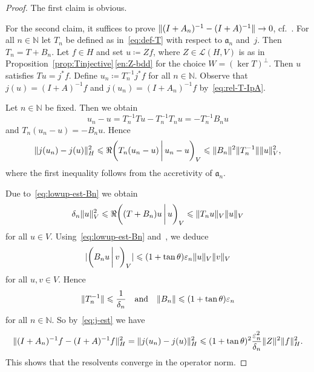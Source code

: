 \documentclass[a4paper,oneside,12pt]{amsart}
\theoremstyle{plain}
\theoremstyle{definition}
\let\le=\leqslant
\DeclarePairedDelimiter\norm{\lVert}{\rVert}
\DeclarePairedDelimiter\abs{\lvert}{\rvert}
\begin{document}
\begin{proof}
The first claim is obvious.

For the second claim, it suffices to prove $\norm{(I+A_n)^{-1} - (I + A)^{-1}}\to 0$, cf.~\cite[Subsection~VIII.1.1]{Kat1}.
For all $n\in{\mathbb{N}}$ let $T_n$ be defined as in~\eqref{eq:def-T} with respect to ${{\mathfrak{{a}}}}_n$ and~$j$. Then $T_n=T+B_n$.
Let $f\in H$ and set $u\coloneqq Zf$, where $Z\in{\mathcal{L}}(H,V)$ is as in Proposition~\ref{prop:Tinjective}\,\ref{en:Z-bdd} for the choice $W=(\ker T)^\perp$.
Then $u$ satisfies $Tu=j^*f$.
Define $u_n\coloneqq T_n^{-1} j^*f$ for all $n\in{\mathbb{N}}$. Observe that $j(u) = (I+A)^{-1}f$ and $j(u_n) = (I+A_n)^{-1}f$ by~\eqref{eq:rel-T-IpA}.

Let $n\in{\mathbb{N}}$ be fixed. Then we obtain 
\[
    u_n - u = T_n^{-1}Tu - T_n^{-1}T_n u = -T_n^{-1} B_n u
\]
and $T_n (u_n-u) = -B_n u$.
Hence
\begin{equation}
\label{eq:j-est}
    \norm{j(u_n) - j(u)}_H^2 \le \Re{{\ifthenelse{\equal{auto}{auto}}{\left({T_n(u_n-u)}\mkern3mu{\biggm|}\mkern3mu {u_n-u}\right)}{}
\ifthenelse{\equal{auto}{b}}{\bigl({T_n(u_n-u)}\mkern3mu{\biggm|}\mkern3mu {u_n-u}\bigr)}{}
\ifthenelse{\equal{auto}{B}}{\Bigl({T_n(u_n-u)}\mkern3mu{\bigm|}\mkern3mu {u_n-u}\Bigr)}{}
}}_V \le \norm{B_n}^2\norm{T_n^{-1}}\norm{u}_V^2,
\end{equation}
where the first inequality follows from the accretivity of ${{\mathfrak{{a}}}}_n$.

Due to~\eqref{eq:lowup-est-Bn} we obtain
\[
    \delta_n\norm{u}_V^2 \le \Re{{\ifthenelse{\equal{auto}{auto}}{\left({(T+B_n)u}\mkern3mu{\biggm|}\mkern3mu {u}\right)}{}
\ifthenelse{\equal{auto}{b}}{\bigl({(T+B_n)u}\mkern3mu{\biggm|}\mkern3mu {u}\bigr)}{}
\ifthenelse{\equal{auto}{B}}{\Bigl({(T+B_n)u}\mkern3mu{\bigm|}\mkern3mu {u}\Bigr)}{}
}}_V\le\norm{T_n u}_V\norm{u}_V
\]
for all $u\in V$. Using~\eqref{eq:lowup-est-Bn} and~\cite[(1.15) in Section~VI.1]{Kat1}, we deduce 
\[
    \abs{{{\ifthenelse{\equal{auto}{auto}}{\left({B_n u}\mkern3mu{\biggm|}\mkern3mu {v}\right)}{}
\ifthenelse{\equal{auto}{b}}{\bigl({B_n u}\mkern3mu{\biggm|}\mkern3mu {v}\bigr)}{}
\ifthenelse{\equal{auto}{B}}{\Bigl({B_n u}\mkern3mu{\bigm|}\mkern3mu {v}\Bigr)}{}
}}_V}\le (1+\tan\theta){\varepsilon}_n\norm{u}_V\norm{v}_V
\]
for all $u,v\in V$. 
Hence 
\[
    \norm{T_n^{-1}}\le \frac{1}{\delta_n}\quad\text{and}\quad\norm{B_n}\le (1+\tan\theta){\varepsilon}_n
\]
for all $n\in{\mathbb{N}}$.
So by~\eqref{eq:j-est} we have
\[
    \norm{(I+A_n)^{-1}f-(I+A)^{-1}f}^2_H = \norm{j(u_n) - j(u)}_H^2 \le (1+\tan\theta)^2\frac{{\varepsilon}_n^2}{\delta_n}\norm{Z}^2\norm{f}^2_H.
\]
This shows that the resolvents converge in the operator norm.
\end{proof}
\end{document}
